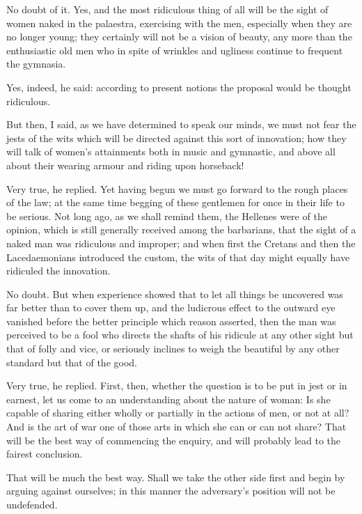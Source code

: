 No doubt of it.
Yes, and the most ridiculous thing of all will be the sight of women naked in the palaestra, exercising with the men, especially when they are no longer young; they certainly will not be a vision of beauty, any more than the enthusiastic old men who in spite of wrinkles and ugliness continue to frequent the gymnasia.

Yes, indeed, he said: according to present notions the proposal would be thought ridiculous.

But then, I said, as we have determined to speak our minds, we must not fear the jests of the wits which will be directed against this sort of innovation; how they will talk of women's attainments both in music and gymnastic, and above all about their wearing armour and riding upon horseback!

Very true, he replied.
Yet having begun we must go forward to the rough places of the law; at the same time begging of these gentlemen for once in their life to be serious. Not long ago, as we shall remind them, the Hellenes were of the opinion, which is still generally received among the barbarians, that the sight of a naked man was ridiculous and improper; and when first the Cretans and then the Lacedaemonians introduced the custom, the wits of that day might equally have ridiculed the innovation.

No doubt.
But when experience showed that to let all things be uncovered was far better than to cover them up, and the ludicrous effect to the outward eye vanished before the better principle which reason asserted, then the man was perceived to be a fool who directs the shafts of his ridicule at any other sight but that of folly and vice, or seriously inclines to weigh the beautiful by any other standard but that of the good.

Very true, he replied.
First, then, whether the question is to be put in jest or in earnest, let us come to an understanding about the nature of woman: Is she capable of sharing either wholly or partially in the actions of men, or not at all? And is the art of war one of those arts in which she can or can not share? That will be the best way of commencing the enquiry, and will probably lead to the fairest conclusion.

That will be much the best way.
Shall we take the other side first and begin by arguing against ourselves; in this manner the adversary's position will not be undefended.

